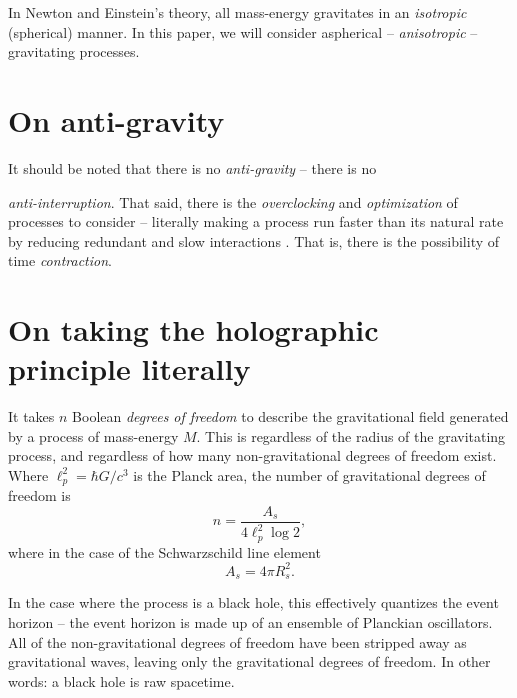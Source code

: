 \documentclass[12pt]{article}
\begin{document}
In Newton and Einstein's theory, all mass-energy gravitates in an {\textit{isotropic}} (spherical) manner.
In this paper, we will consider aspherical -- {\textit{anisotropic}} -- gravitating processes.







\section{On anti-gravity}

It should be noted that there is no {\textit{anti-gravity}} -- there is no {\textit{anti-interruption}.
That said, there is the {\textit{overclocking}} and {\textit{optimization}} of processes to consider -- literally making a process run faster than its natural rate by reducing redundant and slow interactions \cite{wainner, mcconnell, pikus}.
That is, there is the possibility of time {\textit{contraction}}.






\section{On taking the holographic principle literally}

It takes $n$ Boolean {\textit{degrees of freedom}} to describe the gravitational field \cite{hooft, susskind, bousso} generated by a process of mass-energy $M$.
This is regardless of the radius of the gravitating process, and regardless of how many non-gravitational degrees of freedom exist.
Where $\ell_p^2 = \hbar G / c^3$ is the Planck area, the number of gravitational degrees of freedom is
\begin{equation}
n = \frac{A_s}{4 \ell_p^2 \log 2},
\end{equation}
where in the case of the Schwarzschild line element
\begin{equation}
A_s = 4 \pi R_s^2.
\end{equation}

In the case where the process is a black hole, this effectively quantizes the event horizon -- the event horizon is made up of an ensemble of Planckian oscillators.
All of the non-gravitational degrees of freedom have been stripped away as gravitational waves, leaving only the gravitational degrees of freedom.
In other words: a black hole is raw spacetime.

}
\end{document}

